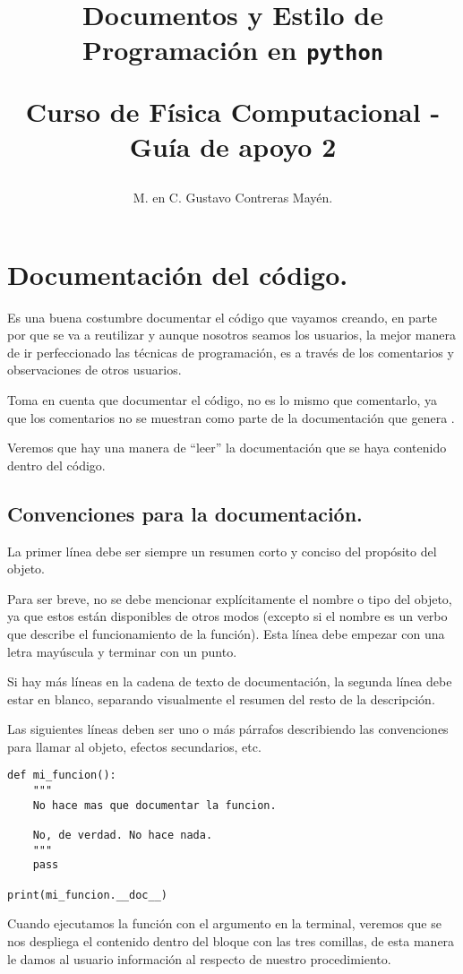 


\title{Documentos y Estilo de Programación en \texttt{python} \\ \begin{Large}Curso de Física Computacional - Guía de apoyo 2 \end{Large}}
\author{M. en C. Gustavo Contreras Mayén.}


\maketitle
\fontsize{14}{14}\selectfont

\section{Documentación del código.}

Es una buena costumbre documentar el código que vayamos creando, en parte por que se va a reutilizar y aunque nosotros seamos los usuarios, la mejor manera de ir perfeccionado las técnicas de programación, es a través de los comentarios y observaciones de otros usuarios.
\par
Toma en cuenta que documentar el código, no es lo mismo que comentarlo, ya que los comentarios no se muestran como parte de la documentación que genera \python.
\par
Veremos que hay una manera de \enquote{leer} la documentación que se haya contenido dentro del código.

\subsection{Convenciones para la documentación.}

La primer línea debe ser siempre un resumen corto y conciso del propósito del objeto.
\par
Para ser breve, no se debe mencionar explícitamente el nombre o tipo del objeto, ya que estos están disponibles de otros modos (excepto si el nombre es un verbo que describe el funcionamiento de la función). Esta línea debe empezar con una letra mayúscula y terminar con un punto.
\par
Si hay más líneas en la cadena de texto de documentación, la segunda línea debe estar en blanco, separando visualmente el resumen del resto de la descripción.
\par
Las siguientes líneas deben ser uno o más párrafos describiendo las convenciones para llamar al objeto, efectos secundarios, etc.
\begin{lstlisting}[caption=Ejemplo de documentación, basicstyle=\linespread{1.2}, columns=fullflexible,escapeinside=||]  
def mi_funcion():
    """
    No hace mas que documentar la funcion.

    No, de verdad. No hace nada.
    """
    pass

print(mi_funcion.__doc__)
\end{lstlisting}
Cuando ejecutamos la función  con el argumento en la terminal, veremos que se nos despliega el contenido dentro del bloque con las tres comillas, de esta manera le damos al usuario información al respecto de nuestro procedimiento.

